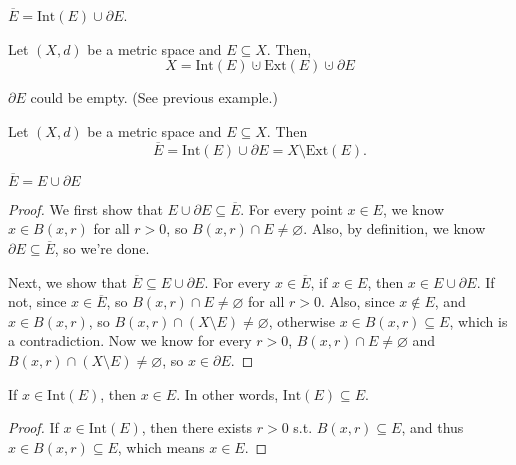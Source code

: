 \begin{corollary} \label{cl: Ebar is IntE cup ptE}
    \(\overline{E} = \mathrm{Int}(E) \cup \partial E  \). 
\end{corollary}

\begin{theorem}
    Let \((X,d)\) be a metric space and \(E \subseteq X\). Then, 
    \[
        X = \mathrm{Int}(E) \cupdot \mathrm{Ext}(E) \cupdot \partial E  
    \]  
\end{theorem}

\begin{remark}
    \(\partial E\) could be empty. (See previous example.) 
\end{remark}

\begin{corollary}
    Let \((X,d)\) be a metric space and \(E \subseteq X\). Then 
    \[
        \overline{E} = \mathrm{Int}(E) \cup \partial E = X \setminus \mathrm{Ext}(E).   
    \]  
\end{corollary}

\begin{lemma} \label{lm: Ebar is E cup pt E}
    \(\overline{E} = E \cup \partial E \) 
\end{lemma}
\begin{proof}
    We first show that \(E \cup \partial E \subseteq \overline{E} \). For every point \(x \in E\), we know \(x \in B(x, r)\) for all \(r > 0\), so \(B(x,r) \cap E \neq \varnothing \). Also, by definition, we know \(\partial E \subseteq \overline{E}\), so we're done. 
    
    Next, we show that \(\overline{E} \subseteq E \cup \partial E \). For every \(x \in \overline{E} \), if \(x \in E\), then \(x \in E \cup \partial E\). If not, since \(x \in \overline{E} \), so \(B(x, r) \cap E \neq \varnothing \) for all \(r>0\). Also, since \(x \notin E\), and \(x \in B(x, r)\), so \(B(x, r) \cap (X \setminus E) \neq \varnothing \), otherwise \(x \in B(x, r) \subseteq E\), which is a contradiction. Now we know for every \(r>0\), \(B(x,r) \cap E \neq \varnothing \) and \(B(x,r) \cap (X \setminus E) \neq  \varnothing \), so \(x \in \partial E\).           
\end{proof}

\begin{lemma}[Discarded] \label{lm: x is interior means x in E}
    If \(x \in \mathrm{Int}(E) \), then \(x \in E\). In other words, \(\mathrm{Int}(E) \subseteq E \). 
\end{lemma}
\begin{proof}
    If \(x \in \mathrm{Int}(E) \), then there exists \(r > 0\) s.t. \(B(x, r) \subseteq E\), and thus \(x \in B(x, r) \subseteq E\), which means \(x \in E\).     
\end{proof}

